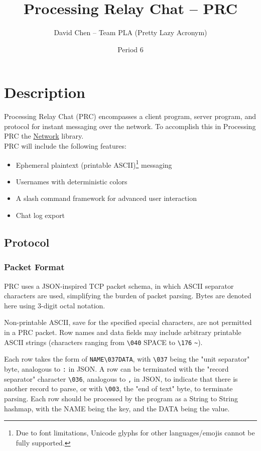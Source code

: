 \documentclass{article}
\title{Processing Relay Chat -- PRC}
\author{David Chen -- Team PLA (Pretty Lazy Acronym)}
\date{Period 6}
\begin{document}
\maketitle

\section{Description}
Processing Relay Chat (PRC) encompasses a client program, server program, and protocol for instant messaging over the network. To accomplish this in Processing PRC the \href{https://processing.org/reference/libraries/net/index.html}{Network} library.\\
PRC will include the following features:
\begin{itemize}
    \item Ephemeral plaintext (printable ASCII)\footnote{Due to font limitations, Unicode glyphs for other languages/emojis cannot be fully supported.} messaging
    \item Usernames with deterministic colors
    \item A slash command framework for advanced user interaction
    \item Chat log export
\end{itemize}

\subsection{Protocol}
\subsubsection{Packet Format}
PRC uses a JSON-inspired TCP packet schema, in which ASCII separator characters are used, simplifying the burden of packet parsing. Bytes are denoted here using 3-digit octal notation.

Non-printable ASCII, save for the specified special characters, are not permitted in a PRC packet. Row names and data fields may include arbitrary printable ASCII strings (characters ranging from \verb|\040| SPACE to \verb|\176| \verb|~|).

Each row takes the form of \verb|NAME\037DATA|, with \verb|\037| being the "unit separator" byte, analogous to \verb|:| in JSON.
A row can be terminated with the "record separator" character \verb|\036|, analogous to \verb|,| in JSON, to indicate that there is another record to parse, or with \verb|\003|, the "end of text" byte, to terminate parsing. Each row should be processed by the program as a String to String hashmap, with the NAME being the key, and the DATA being the value.
\end{document}
